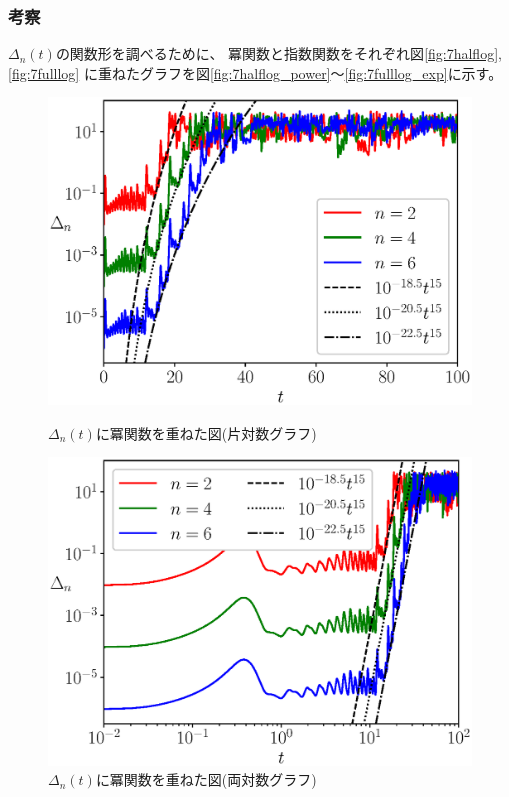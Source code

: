 \documentclass[a4j, titlepage]{jsarticle}
\numberwithin{equation}{section}
\begin{document}
        \subsubsection{考察}
            $\Delta_n(t)$の関数形を調べるために、
            冪関数と指数関数をそれぞれ図\ref{fig:7halflog}, \ref{fig:7fulllog}
            に重ねたグラフを図\ref{fig:7halflog_power}〜\ref{fig:7fulllog_exp}に示す。
            \begin{figure}[h]
                \begin{minipage}{0.49\hsize}
                    \centering
                    \includegraphics[width=1\hsize]{kadai7/2halflog_power.eps}
                    \caption{
                        $\Delta_n(t)$に冪関数を重ねた図(片対数グラフ)
                    }
                    \label{fig:7halflog_power}
                \end{minipage}
                \begin{minipage}{0.49\hsize}
                    \centering
                    \includegraphics[width=1\hsize]{kadai7/2fulllog_power.eps}
                    \caption{
                        $\Delta_n(t)$に冪関数を重ねた図(両対数グラフ)
                    }
                    \label{fig:7fulllog_power}
                \end{minipage}
            \end{figure}
\end{document}
